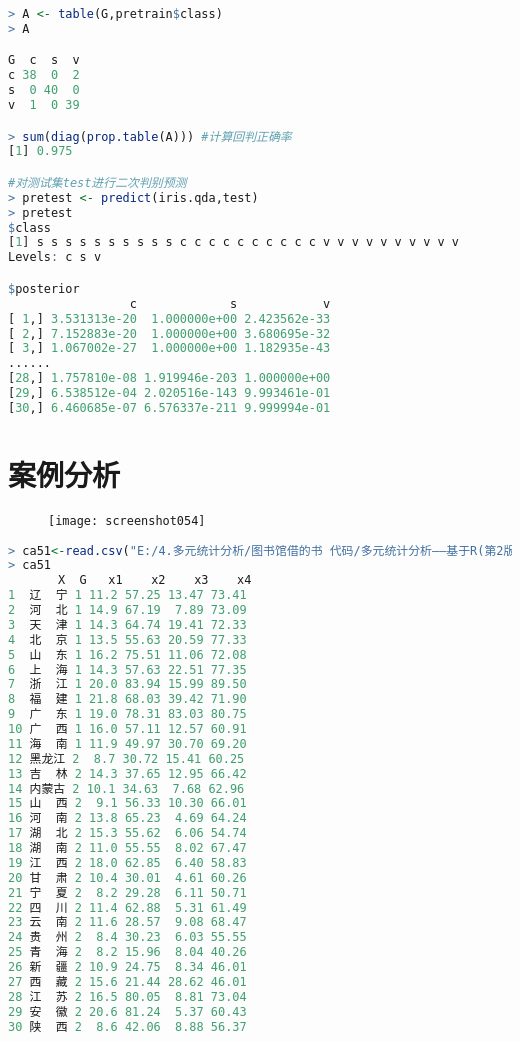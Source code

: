 \documentclass[11pt,a4paper,oneside]{book}
\begin{document}
\begin{lstlisting}[language=r]
> A <- table(G,pretrain$class)
> A

G  c  s  v
c 38  0  2
s  0 40  0
v  1  0 39

> sum(diag(prop.table(A))) #计算回判正确率
[1] 0.975

#对测试集test进行二次判别预测
> pretest <- predict(iris.qda,test)
> pretest
$class
[1] s s s s s s s s s s c c c c c c c c c c v v v v v v v v v v
Levels: c s v

$posterior
                 c             s            v
[ 1,] 3.531313e-20  1.000000e+00 2.423562e-33
[ 2,] 7.152883e-20  1.000000e+00 3.680695e-32
[ 3,] 1.067002e-27  1.000000e+00 1.182935e-43
......
[28,] 1.757810e-08 1.919946e-203 1.000000e+00
[29,] 6.538512e-04 2.020516e-143 9.993461e-01
[30,] 6.460685e-07 6.576337e-211 9.999994e-01
\end{lstlisting}

\section{案例分析}
\begin{figure}[H]
	\centering
	\texttt{[image: screenshot054]}
\end{figure}
\begin{lstlisting}[language=r]
> ca51<-read.csv("E:/4.多元统计分析/图书馆借的书 代码/多元统计分析——基于R(第2版) R-data/case5.1.csv")
> ca51
       X  G   x1    x2    x3    x4
1  辽  宁 1 11.2 57.25 13.47 73.41
2  河  北 1 14.9 67.19  7.89 73.09
3  天  津 1 14.3 64.74 19.41 72.33
4  北  京 1 13.5 55.63 20.59 77.33
5  山  东 1 16.2 75.51 11.06 72.08
6  上  海 1 14.3 57.63 22.51 77.35
7  浙  江 1 20.0 83.94 15.99 89.50
8  福  建 1 21.8 68.03 39.42 71.90
9  广  东 1 19.0 78.31 83.03 80.75
10 广  西 1 16.0 57.11 12.57 60.91
11 海  南 1 11.9 49.97 30.70 69.20
12 黑龙江 2  8.7 30.72 15.41 60.25
13 吉  林 2 14.3 37.65 12.95 66.42
14 内蒙古 2 10.1 34.63  7.68 62.96
15 山  西 2  9.1 56.33 10.30 66.01
16 河  南 2 13.8 65.23  4.69 64.24
17 湖  北 2 15.3 55.62  6.06 54.74
18 湖  南 2 11.0 55.55  8.02 67.47
19 江  西 2 18.0 62.85  6.40 58.83
20 甘  肃 2 10.4 30.01  4.61 60.26
21 宁  夏 2  8.2 29.28  6.11 50.71
22 四  川 2 11.4 62.88  5.31 61.49
23 云  南 2 11.6 28.57  9.08 68.47
24 贵  州 2  8.4 30.23  6.03 55.55
25 青  海 2  8.2 15.96  8.04 40.26
26 新  疆 2 10.9 24.75  8.34 46.01
27 西  藏 2 15.6 21.44 28.62 46.01
28 江  苏 2 16.5 80.05  8.81 73.04
29 安  徽 2 20.6 81.24  5.37 60.43
30 陕  西 2  8.6 42.06  8.88 56.37
\end{lstlisting}
\end{document}
